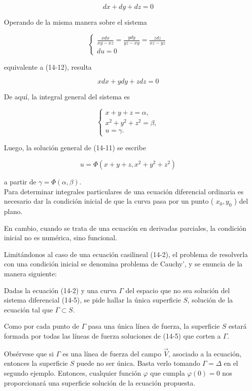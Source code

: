 \documentclass[10pt]{article}
\theoremstyle{plain}
\theoremstyle{definition}
\theoremstyle{remark}
\begin{document}
$$
d x+d y+d z=0
$$

Operando de la misma manera sobre el sistema


$$
\left\{\begin{array}{l}
\frac{x d x}{x y-x z}=\frac{y d y}{y z-x y}=\frac{z d z}{x z-y z} \\
d u=0
\end{array}\right.
$$

equivalente a (14-12), resulta

$$
x d x+y d y+z d z=0
$$

De aquí, la integral general del sistema es

$$
\left\{\begin{array}{l}
x+y+z=\alpha, \\
x^{2}+y^{2}+z^{2}=\beta, \\
u=\gamma .
\end{array}\right.
$$

Luego, la solución general de (14-11) se escribe

$$
u=\Phi\left(x+y+z, x^{2}+y^{2}+z^{2}\right)
$$

a partir de $\gamma=\Phi(\alpha, \beta)$.\\
Para determinar integrales particulares de una ecuación diferencial ordinaria es necesario dar la condición inicial de que la curva pasa por un punto ( $x_{0}, y_{0}$ ) del plano.

En cambio, cuando se trata de una ecuación en derivadas parciales, la condición inicial no es numérica, sino funcional.

Limitándonos al caso de una ecuación casilineal (14-2), el problema de resolverla con una condición inicial se denomina problema de Cauchy', y se enuncia de la manera siguiente:

Dadas la ecuación (14-2) y una curva $\Gamma$ del espacio que no sea solución del sistema diferencial (14-5), se pide hallar la única superficie $S$, solución de la ecuación tal que $\Gamma \subset S$.

Como por cada punto de $\Gamma$ pasa una única línea de fuerza, la superficie $S$ estará formada por todas las líneas de fuerza soluciones de (14-5) que corten a $\Gamma$.

Obsérvese que si $\Gamma$ es una línea de fuerza del campo $\vec{V}$, asociado a la ecuación, entonces la superficie $S$ puede no ser única. Basta verlo tomando $\Gamma=\Delta$ en el segundo ejemplo. Entonces, cualquier función $\varphi$ que cumpla $\varphi(0)=0$ nos proporcionará una superficie solución de la ecuación propuesta.
\end{document}
